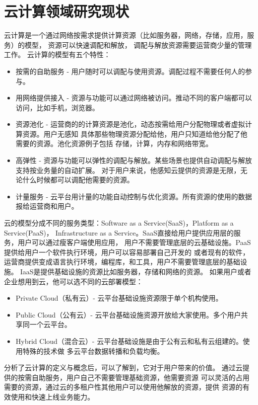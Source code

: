 \section{云计算领域研究现状}
\label{subsec:cloud_background}
云计算是一个通过网络按需求提供计算资源（比如服务器，网络，存储，应用，服务）的模型，
资源可以快速调配和解放，
调配与解放资源需要运营商少量的管理工作。\cite{mell2011nist}
云计算的模型有五个特性：
\begin{itemize}
  \item 按需的自助服务 - 
        用户随时可以调配与使用资源。调配过程不需要任何人的参与。
  \item 用网络提供接入 - 
        资源与功能可以通过网络被访问。推动不同的客户端都可以访问，比如手机，浏览器。
  \item 资源池化 - 
        运营商的的计算资源是池化，动态按需给用户分配物理或者虚拟计算资源。用户无感知
        具体那些物理资源分配给他，用户只知道给他分配了他需要的资源。池化资源例子包括
        存储，计算，内存和网络带宽。
  \item 高弹性 - 
        资源与功能可以弹性的调配与解放。某些场景也提供自动调配与解放支持按业务量的自动扩展。
        对于用户来说，他感知云提供的资源是无限，无论什么时候都可以调配他需要的资源。
  \item 计量服务 - 
        云平台用计量的功能自动控制与优化资源。所有资源的使用的数据报给运营商和用户。
\end{itemize}
云的模型分成不同的服务类型：Software as a Service(SaaS)，Platform as a Service(PaaS)，
Infrastructure as a Service。SaaS直接给用户提供应用层的服务，用户可以通过瘦客户端使用应用，
用户不需要管理底层的云基础设施。PaaS提供给用户一个软件执行环境，用户可以容易部署自己开发的
或者现有的软件，运营商提供变成语言执行环境，编程库，和工具，用户不需要管理底层的基础设施。
IaaS是提供基础设施的资源比如服务器，存储和网络的资源。
如果用户或者企业想用到云，他可以选不同的云部署模型：
\begin{itemize}
  \item Private Cloud（私有云）- 
        云平台基础设施资源限于单个机构使用。
  \item Public Cloud（公有云）- 
        云平台基础设施资源开放给大家使用。多个用户共享同一个云平台。
  \item Hybrid Cloud（混合云）-
        云平台基础设施是由于公有云和私有云组建的。使用特殊的技术做
        多云平台数据转播和负载均衡。
\end{itemize}

分析了云计算的定义与概念后，可以了解到，它对于用户带来的价值。
通过云提供的按需自助服务，用户自己不需要管理基础资源，他需要资源
可以灵活的占用需要的资源，通过云的多租户性其他用户可以使用他解放的资源，提供
资源的有效使用和快速上线业务能力。

